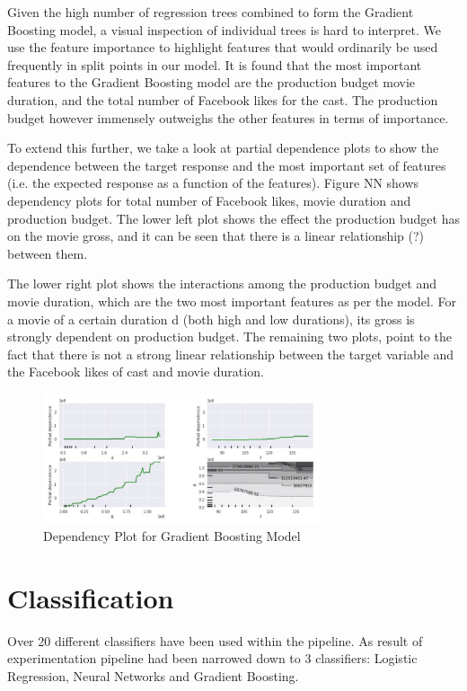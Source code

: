 Given the high number of regression trees combined to form the Gradient Boosting model, a visual inspection of individual trees is hard to interpret. We use the feature importance to highlight features that would ordinarily be used frequently in split points in our model. It is found that the most important features to the Gradient Boosting model are the production budget movie duration, and the total number of Facebook likes for the cast.  The production budget however immensely outweighs the other features in terms of importance. 

To extend this further, we take a look at partial dependence plots to show the dependence between the target response and the most important set of features (i.e. the expected response as a function of the features). Figure NN shows dependency plots for total number of Facebook likes, movie duration and production budget. The lower left plot shows the effect the production budget has on the movie gross, and it can be seen that there is a linear relationship (?) between them. 

The lower right plot shows the interactions among the production budget and movie duration, which are the two most important features as per the model. For a movie of a certain duration d (both high and low durations), its gross is strongly dependent on production budget.  The remaining two plots, point to the fact that there is not a strong linear relationship between the target variable and the Facebook likes of cast and movie duration.
\begin{figure}[h]
\centering
\includegraphics[width=3.2in]{figures/gradient_boost_dependency}
\caption{Dependency Plot for Gradient Boosting Model \cite{figgradientdep}}
\label{fig:figgradientdep}
\end{figure}
\section{Classification}
Over 20 different classifiers have been used within the pipeline. As result of experimentation pipeline had been narrowed down to 3 classifiers: Logistic Regression, Neural Networks and Gradient Boosting.

